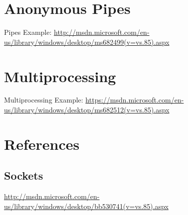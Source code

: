 \documentclass[letterpaper,10pt]{article}
\begin{document}
\begin{comment}
\subsection{close/closesocket}
Widows:
int closesocket(
  \_In\_  SOCKET s
);

POSIX:
int close(int fildes);

\subsection{send}
Windows:
int send(
  \_In\_  SOCKET s,
  \_In\_  const char *buf,
  \_In\_  int len,
  \_In\_  int flags
);

POSIX:
ssize\_t send(int socket, const void *buffer, size\_t length, int flags);

\subsection{recv}
Windows:
int recv(
  \_In\_   SOCKET s,
  \_Out\_  char *buf,
  \_In\_   int len,
  \_In\_   int flags
);

POSIX:
ssize\_t recv(int socket, void *buffer, size\_t length, int flags);

\end{comment}

\section{Anonymous Pipes}

Pipes Example: \url{http://msdn.microsoft.com/en-us/library/windows/desktop/ms682499(v=vs.85).aspx}

\section{Multiprocessing}

Multiprocessing Example: \url{https://msdn.microsoft.com/en-us/library/windows/desktop/ms682512(v=vs.85).aspx}

\newpage

\section{References}

\subsection{Sockets}
\url{http://msdn.microsoft.com/en-us/library/windows/desktop/bb530741(v=vs.85).aspx}
\end{document}
